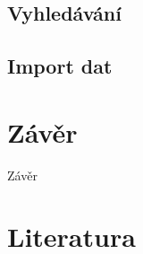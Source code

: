 \documentclass[11pt,draft,oneside]{fithesis2}
\begin{document}
\section{Vyhledávání}

\section{Import dat}

\chapter{Závěr}
Závěr



\printindex

\begingroup
\def\tmpchapter{0}
\renewcommand{\chaptername}{}
\renewcommand{\thechapter}{}
\chapter{Literatura}
\renewcommand{\chapter}[2]{}%




\endgroup

\appendix

\end{document}
